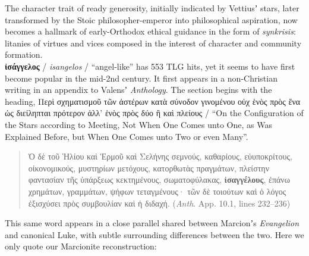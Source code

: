 \noindent{}The character trait of ready generosity, %
initially indicated by Vettiusʼ stars, %
later transformed by the Stoic philosopher-emperor into philosophical aspiration, %
now becomes a hallmark of early-Orthodox ethical guidance in the form of \textit{synkrisis}: %
litanies of virtues and vices composed in the interest of character and community formation. \\[1.5mm] %

\noindent{}\textbf{ἰσάγγελος} / \textit{isangelos} / “angel-like” %
has 553 TLG hits, yet it seems to have first become popular in the mid-2nd century. %
It first appears in a non-Christian writing in an appendix to Valensʼ \textit{Anthology}. %
The section begins with the heading, %
Περὶ σχηματισμοῦ τῶν ἀστέρων κατὰ σύνοδον γινομένου οὐχ ἑνὸς πρὸς
ἕνα ὡς διείληπται πρότερον ἀλλ’ ἑνὸς πρὸς δύο ἢ καὶ πλείους / %
“On the Configuration of the Stars according to Meeting, %
Not When One Comes unto One, as Was Explained Before, %
but When One Comes unto Two or even Many”. %

\vspace*{2mm} 
 \begin{quote}Ὁ δὲ τοῦ Ἡλίου καὶ Ἑρμοῦ καὶ Σελήνης σεμνούς, καθαρίους, εὐυποκρίτους, %
 οἰκονομικούς, μυστηρίων μετόχους, κατορθωτὰς πραγμάτων,
 πλείστην φαντασίαν τῆς ὑπάρξεως κεκτημένους, σωματοφύλακας,
 \textbf{ἰσαγγέλους}, ἐπάνω χρημάτων, γραμμάτων, ψήφων τεταγμένους· %
 τῶν δὲ τοιούτων καὶ ὁ λόγος ἐξισχύσει πρὸς συμβουλίαν καὶ ἡ διδαχή. (\textit{Anth}. App. 10.1, lines 232--236) \\[1mm] %
 \end{quote} %
 \vspace*{2mm}

This same word appears in a close parallel shared between Marcionʼs \textit{Evangelion} and canonical Luke, %
with subtle surrounding differences between the two. %
Here we only quote our Marcionite reconstruction: %

